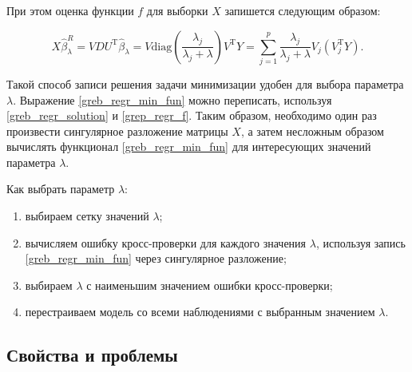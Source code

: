 \documentclass[specialist,
               subf,href,colorlinks=true, 12pt,a4paper]{article} %
\newcommand{\T}{\mathrm{T}}
\numberwithin{equation}{section}
\begin{document}
При этом оценка функции $f$ для выборки $X$ запишется следующим образом:

\begin{equation}\label{grep_regr_f}
X\hat{\beta}_{\lambda}^{R} = VDU^{\T}\hat{\beta}_{\lambda} = V \mathrm{diag}(\frac{\lambda_j}{\lambda_j + \lambda}) V^{\T}Y = \sum_{j=1}^p \frac{\lambda_j}{\lambda_j + \lambda} V_j(V_j^{\T}Y).
\end{equation}

Такой способ записи решения задачи минимизации удобен для выбора параметра $\lambda$.  Выражение \eqref{greb_regr_min_fun} можно переписать, используя  \eqref{greb_regr_solution} и \eqref{grep_regr_f}. Таким образом, необходимо один раз произвести сингулярное разложение матрицы $X$, а затем несложным образом вычислять функционал \eqref{greb_regr_min_fun} для интересующих значений параметра $\lambda$. 

Как выбрать параметр $\lambda$:
\begin{enumerate}
\item выбираем сетку значений $\lambda$;
\item вычисляем ошибку кросс-проверки для каждого значения $\lambda$, используя запись \eqref{greb_regr_min_fun} через сингулярное разложение;
\item выбираем $\lambda$ с наименьшим значением ошибки кросс-проверки;
\item перестраиваем модель со всеми наблюдениями с выбранным значением $\lambda$.
\end{enumerate}


\subsection{Свойства и проблемы}
\end{document}
